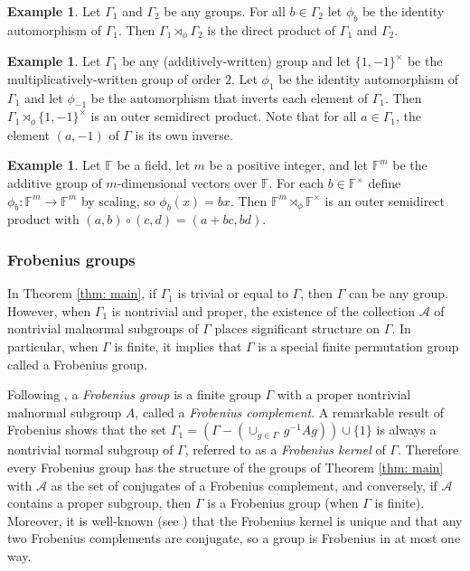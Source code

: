 \documentclass[12pt]{article}
\theoremstyle{definition}
\newtheorem{example}[theorem]{Example}
\newcommand{\bF}{\mathbb F}
\newcommand{\cA}{\mathcal{A}}
\begin{document}
\begin{example} \label{ex: direct product}
Let $\Gamma_1$ and $\Gamma_2$ be any groups.
For all $b \in \Gamma_2$ let $\phi_b$ be the identity automorphism of $\Gamma_1$.
Then $\Gamma_1 \rtimes_{\phi} \Gamma_2$ is the direct product of $\Gamma_1$ and $\Gamma_2$.
\end{example}


\begin{example} \label{ex: semidirect product with {1,-1}}
Let $\Gamma_1$ be any (additively-written) group and let $\{1, -1\}^{\times}$ be the multiplicatively-written group of order $2$.
Let $\phi_1$ be the identity automorphism of $\Gamma_1$ and let $\phi_{-1}$ be the automorphism that inverts each element of $\Gamma_1$.
Then $\Gamma_1 \rtimes_{\phi} \{1, -1\}^{\times}$ is an outer semidirect product.
Note that for all $a \in \Gamma_1$, the element $(a, -1)$ of $\Gamma$ is its own inverse.
\end{example}


\begin{example} \label{ex: finite field semidirect product}
Let $\bF$ be a field, let $m$ be a positive integer, and let $\bF^m$ be the additive group of $m$-dimensional vectors over $\bF$.
For each $b \in \bF^{\times}$ define $\phi_b \colon \bF^m \to \bF^m$ by scaling, so $\phi_b(x) = bx$.
Then $\bF^m \rtimes_{\phi} \bF^{\times}$ is an outer semidirect product with $(a,b) \circ (c,d) = (a + bc, bd)$.
\end{example}





\subsubsection{Frobenius groups}
In Theorem \ref{thm: main}, if $\Gamma_1$ is trivial or equal to $\Gamma$, then $\Gamma$ can be any group.
However, when $\Gamma_1$ is nontrivial and proper, the existence of the collection $\cA$ of nontrivial malnormal subgroups of $\Gamma$ places significant structure on $\Gamma$.
In particular, when $\Gamma$ is finite, it implies that $\Gamma$ is a special finite permutation group called a Frobenius group.




Following \cite{Frobenius-groups}, a \emph{Frobenius group} is a finite group $\Gamma$ with a proper nontrivial malnormal subgroup $A$, called a \emph{Frobenius complement}.
A remarkable result of Frobenius shows that the set $\Gamma_1 = (\Gamma - (\cup_{g \in \Gamma} \, g^{-1}Ag)) \cup \{1\}$ is always a nontrivial normal subgroup of $\Gamma$, referred to as a \emph{Frobenius kernel} of $\Gamma$.
Therefore every Frobenius group has the structure of the groups of Theorem \ref{thm: main} with $\cA$ as the set of conjugates of a Frobenius complement, and conversely, if $\cA$ contains a proper subgroup, then $\Gamma$ is a Frobenius group (when $\Gamma$ is finite).
Moreover, it is well-known (see \cite[Theorem 4.2]{Frobenius-groups}) that the Frobenius kernel is unique and that any two Frobenius complements are conjugate, so a group is Frobenius in at most one way.
\end{document}
